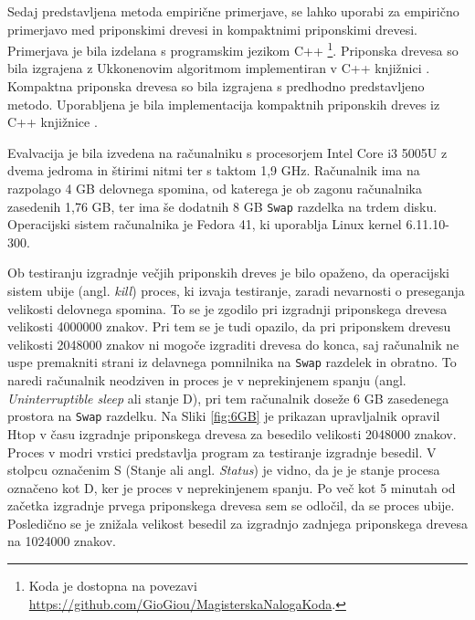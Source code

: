 

Sedaj predstavljena metoda empirične primerjave, se lahko uporabi za empirično primerjavo med priponskimi drevesi in kompaktnimi priponskimi drevesi. Primerjava je bila izdelana s programskim jezikom C++ \footnote{Koda je dostopna na povezavi \url{https://github.com/GioGiou/MagisterskaNalogaKoda}.}. Priponska drevesa so bila izgrajena z Ukkonenovim algoritmom implementiran v C++ knjižnici \cite{ganeshk13}. Kompaktna priponska drevesa so bila izgrajena s predhodno predstavljeno metodo. Uporabljena je bila implementacija kompaktnih priponskih dreves iz C++ knjižnice \cite{gbmp2014sea}.

Evalvacija je bila izvedena na računalniku s procesorjem Intel Core i3 5005U z dvema jedroma in štirimi nitmi ter s taktom 1,9 GHz. Računalnik ima na razpolago 4 GB delovnega spomina, od katerega je ob zagonu računalnika zasedenih 1,76 GB, ter ima še dodatnih 8 GB \verb|Swap| razdelka na trdem disku. Operacijski sistem računalnika je Fedora 41, ki uporablja Linux kernel 6.11.10-300. 

Ob testiranju izgradnje večjih priponskih dreves je bilo opaženo, da operacijski sistem ubije (angl. \textit{kill}) proces, ki izvaja testiranje, zaradi nevarnosti o preseganja velikosti delovnega spomina. To se je zgodilo pri izgradnji priponskega drevesa velikosti 4000000 znakov. Pri tem se je tudi opazilo, da pri priponskem drevesu velikosti 2048000 znakov ni mogoče izgraditi drevesa do konca, saj računalnik ne uspe premakniti strani iz delavnega pomnilnika na \verb|Swap| razdelek in obratno. To naredi računalnik  neodziven in proces je v neprekinjenem spanju (angl. \textit{Uninterruptible sleep} ali stanje D), pri tem računalnik doseže 6 GB zasedenega prostora na \verb|Swap| razdelku. Na Sliki \ref{fig:6GB} je prikazan upravljalnik opravil Htop v času izgradnje priponskega drevesa za  besedilo velikosti 2048000 znakov. Proces v modri vrstici predstavlja program za testiranje izgradnje besedil. V stolpcu označenim S (Stanje ali angl. \textit{Status}) je vidno, da je je stanje procesa označeno kot D, ker je proces v neprekinjenem spanju. Po več kot 5 minutah od začetka izgradnje prvega priponskega drevesa sem se odločil, da se proces ubije. Posledično se je znižala velikost besedil za izgradnjo zadnjega priponskega drevesa na 1024000 znakov.

